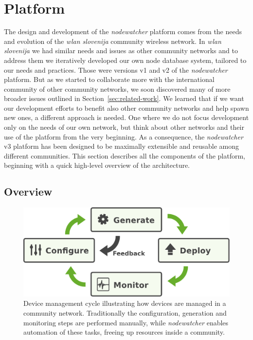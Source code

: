 \documentclass[5p,sort&compress]{elsarticle}
\newcommand{\nodewatcher}{\textit{nodewatcher}}
\newcommand{\wlanslovenija}{\textit{wlan slovenija}}
\begin{document}
\section{Platform}
\label{sec:platform}

The design and development of the \nodewatcher{} platform comes from the needs and evolution of the \wlanslovenija{} community wireless network.
In \wlanslovenija{} we had similar needs and issues as other community networks and to address them we iteratively developed our own node database system, tailored to our needs and practices.
Those were versions v1 and v2 of the \nodewatcher{} platform.
But as we started to collaborate more with the international community of other community networks, we soon discovered many of more broader issues outlined in Section~\ref{sec:related-work}.
We learned that if we want our development efforts to benefit also other community networks and help spawn new ones, a different approach is needed.
One where we do not focus development only on the needs of our own network, but think about other networks and their use of the platform from the very beginning.
As a consequence, the \nodewatcher{} v3 platform has been designed to be maximally extensible and reusable among different communities.
This section describes all the components of the platform, beginning with a quick high-level overview of the architecture.

\subsection{Overview}

\begin{figure}
  \centering
  \includegraphics[scale=0.4]{figures/device-mgmt-cycle.pdf}
  \caption{Device management cycle illustrating how devices are managed in a community network.
Traditionally the configuration, generation and monitoring steps are performed manually, while \nodewatcher{} enables automation of these tasks, freeing up resources inside a community.}
  \label{fig:device-mgmt-cycle}
\end{figure}
\end{document}
